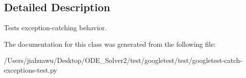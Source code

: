 \subsection{Detailed Description}
\begin{DoxyVerb}Tests exception-catching behavior.\end{DoxyVerb}
 

The documentation for this class was generated from the following file\+:\begin{DoxyCompactItemize}
\item 
/\+Users/jiahuawu/\+Desktop/\+O\+D\+E\+\_\+\+Solver2/test/googletest/test/googletest-\/catch-\/exceptions-\/test.\+py\end{DoxyCompactItemize}
